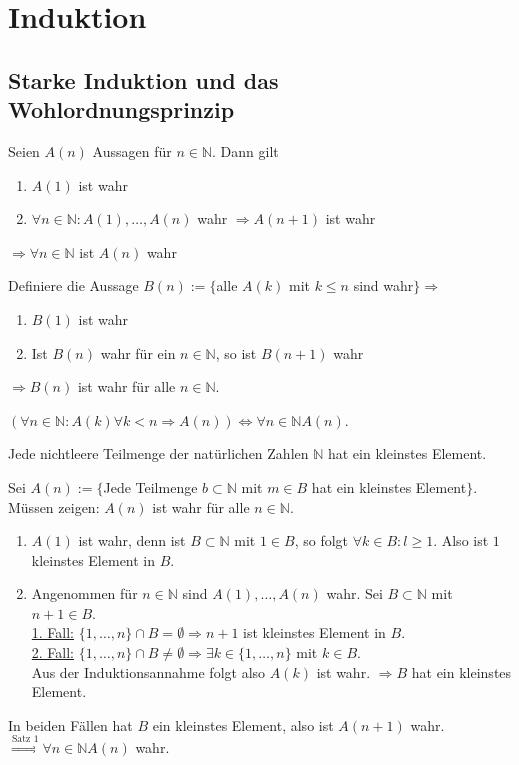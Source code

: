 \documentclass[../ana1.tex]{subfiles}
\begin{document}
\section{Induktion}
\subsection{Starke Induktion und das Wohlordnungsprinzip}
\begin{satz}
	Seien $A(n)$ Aussagen für $n\in\mathbb{N}$. Dann gilt
	\begin{enumerate}
		\item $A(1)$ ist wahr
		\item $\forall n\in\mathbb{N}: A(1), \ldots, A(n)$ wahr $\Rightarrow A(n+1)$ ist wahr
	\end{enumerate}
	$\Rightarrow \forall n\in\mathbb{N}$ ist $A(n)$ wahr
\end{satz}
\begin{bew}
	Definiere die Aussage $B(n) := \{$alle $A(k)$ mit $k\leq n$ sind wahr$\}\Rightarrow$
	\begin{enumerate}
		\item $B(1)$ ist wahr
		\item Ist $B(n)$ wahr für ein $n\in\mathbb{N}$, so ist $B(n+1)$ wahr
	\end{enumerate}
	$\Rightarrow B(n)$ ist wahr für alle $n\in\mathbb{N}$.
\end{bew}
\begin{bem}
	$(\forall n\in\mathbb{N}:A(k) \forall k<n \Rightarrow A(n)) \Leftrightarrow \forall n\in\mathbb{N} A(n)$.
\end{bem}
\begin{satz}
	Jede nichtleere Teilmenge der natürlichen Zahlen $\mathbb{N}$ hat ein kleinstes Element.
\end{satz}
\begin{bew}
	Sei $A(n):= \{$Jede Teilmenge $b\subset\mathbb{N}$ mit $m\in B$ hat ein kleinstes Element$\}$.\\
	Müssen zeigen: $A(n)$ ist wahr für alle $n\in\mathbb{N}$.
	\begin{enumerate}
		\item $A(1)$ ist wahr, denn ist $B\subset \mathbb{N}$ mit $1\in B$, so folgt $\forall k \in B: l\geq 1$. Also ist $1$ kleinstes Element in $B$.
		\item Angenommen für $n\in\mathbb{N}$ sind $A(1),\ldots,A(n)$ wahr. Sei $B\subset \mathbb{N}$ mit $n+1\in B$.\\
		      \underline{1. Fall:} $\{1,\ldots,n\}\cap B = \emptyset \Rightarrow n+1$ ist kleinstes Element in $B$.\\
		      \underline{2. Fall:} $\{1,\ldots,n\} \cap B \neq \emptyset \Rightarrow \exists k\in \{1,\ldots,n\}$ mit $k\in B$.\\
		      Aus der Induktionsannahme folgt also $A(k)$ ist wahr. $\Rightarrow B$ hat ein kleinstes Element.
	\end{enumerate}
	In beiden Fällen hat $B$ ein kleinstes Element, also ist $A(n+1)$ wahr.\\
	$\overset{\text{Satz 1}}{\Rightarrow} \forall n\in \mathbb{N} A(n)$ wahr.
\end{bew}
\end{document}
